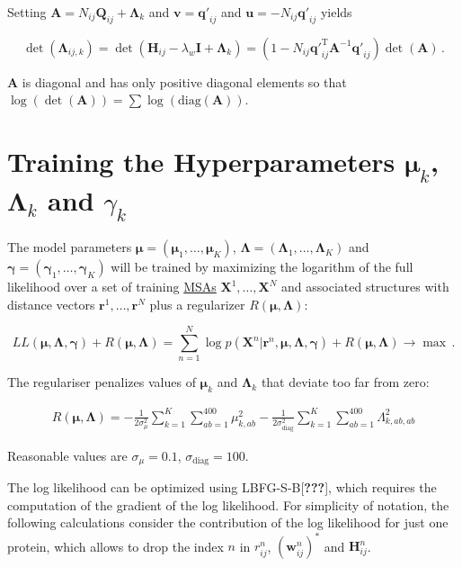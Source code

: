 \documentclass[12pt,a4paper,twoside]{book}
\renewcommand{\H}{\mathbf{H}}
\newcommand{\Hij}{\H_{ij}}
\newcommand{\I}{\mathbf{I}}
\newcommand{\Lijk}{\mathbf{\Lambda}_{ij,k}}
\newcommand{\Lk}{\mathbf{\Lambda}_k}
\newcommand{\muk}{\mathbf{\mu}_k}
\renewcommand{\r}{\mathbf{r}}
\newcommand{\rij}{r_{ij}}
\newcommand{\Qij}{\mathbf{Q}_{ij}}
\newcommand{\qij}{\mathbf{q\prime}_{ij}}
\renewcommand{\v}{\mathbf{v}}
\newcommand{\wij}{\mathbf{w}_{ij}}
\newcommand{\X}{\mathbf{X}}
\theoremstyle{definition}
\theoremstyle{definition}
\theoremstyle{remark}
\begin{document}
Setting \(\mathbf{A} = N_{ij} \Qij + \Lk\) and \(\v = \qij\) and
\(\mathbf{u} = - N_{ij} \qij\) yields

\begin{equation}
  \det(\Lijk ) = \det(\H_{ij} - \lambda_w \I + \Lk) = (1 - N_{ij}\qij^\mathrm{T} \mathbf{A}^{-1}\qij) \det(\mathbf{A}) \,.
\end{equation}

\(\mathbf{A}\) is diagonal and has only positive diagonal elements so
that
\(\log(\det(\mathbf{A})) = \sum \log \left( \text{diag}(\mathbf{A}) \right)\).

\section{\texorpdfstring{Training the Hyperparameters \(\muk\), \(\Lk\)
and
\(\gamma_k\)}{Training the Hyperparameters \textbackslash{}muk, \textbackslash{}Lk and \textbackslash{}gamma\_k}}\label{training-hyperparameters}

The model parameters
\(\mathbf{\mu} = (\mathbf{\mu}_{1},\ldots,\mathbf{\mu}_K)\),
\(\mathbf{\Lambda} = (\mathbf{\Lambda}_1,\ldots,\mathbf{\Lambda}_K)\)
and \(\mathbf{\gamma} = (\mathbf{\gamma}_1,\ldots,\mathbf{\gamma}_K)\)
will be trained by maximizing the logarithm of the full likelihood over
a set of training \protect\hyperlink{abbrev}{MSAs} \(\X^1,\ldots,\X^N\)
and associated structures with distance vectors \(\r^1,\ldots,\r^N\)
plus a regularizer \(R(\mathbf{\mu}, \mathbf{\Lambda})\):

\begin{equation}
    L\!L(\mathbf{\mu}, \mathbf{\Lambda}, \mathbf{\gamma}) + R(\mathbf{\mu}, \mathbf{\Lambda}) = \sum_{n=1}^N  \log p(\X^n | \r^n, \mathbf{\mu}, \mathbf{\Lambda}, \mathbf{\gamma} ) + R(\mathbf{\mu}, \mathbf{\Lambda})  \rightarrow \max \, .
\end{equation}

The regulariser penalizes values of \(\muk\) and \(\Lk\) that deviate
too far from zero:

\begin{align}
    R(\mathbf{\mu}, \mathbf{\Lambda}) = -\frac{1}{2 \sigma_{\mu}^2} \sum_{k=1}^K \sum_{ab=1}^{400} \mu_{k,ab}^2 
                        -\frac{1}{2 \sigma_\text{diag}^2} \sum_{k=1}^K \sum_{ab=1}^{400} \Lambda_{k,ab,ab}^2
\label{eq:reg}
\end{align}

Reasonable values are \(\sigma_{\mu}=0.1\),
\(\sigma_\text{diag} = 100\).

The log likelihood can be optimized using LBFG-S-B{[}{\textbf{???}}{]},
which requires the computation of the gradient of the log likelihood.
For simplicity of notation, the following calculations consider the
contribution of the log likelihood for just one protein, which allows to
drop the index \(n\) in \(\rij^n\), \((\wij^n)^*\) and \(\Hij^n\).
\end{document}
